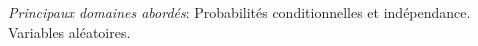 
\medskip

\emph{Principaux domaines abordés}: Probabilités conditionnelles et indépendance. Variables aléatoires.

\medskip

%
%
%
%

